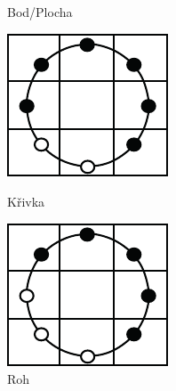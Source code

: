 \begin{figure}[H]
\begin{minipage}[b]{.18\textwidth}
  \caption*{Bod/Plocha}
\end{minipage}
\begin{minipage}[b]{.18\textwidth}
  \centering
  \includegraphics[width=.9\linewidth]{figures/lbp_line}
  \caption*{Křivka}
\end{minipage}
\begin{minipage}[b]{.18\textwidth}
  \centering
  \includegraphics[width=.9\linewidth]{figures/lbp_corner}
  \caption*{Roh}
\end{minipage}
\begin{minipage}[b]{.18\textwidth}
  \centering

\end{minipage}
\end{figure}
